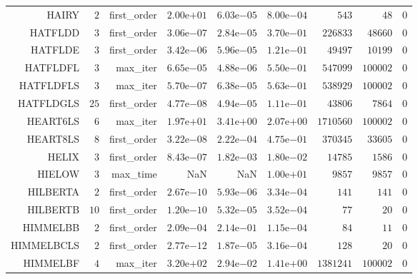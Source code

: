 \begin{longtable}{rrrrrrrrr}
HAIRY & \(     2\) & first\_order & \( 2.00\)e\(+01\) & \( 6.03\)e\(-05\) & \( 8.00\)e\(-04\) & \(   543\) & \(    48\) & \(     0\) \\
HATFLDD & \(     3\) & first\_order & \( 3.06\)e\(-07\) & \( 2.84\)e\(-05\) & \( 3.70\)e\(-01\) & \(226833\) & \( 48660\) & \(     0\) \\
HATFLDE & \(     3\) & first\_order & \( 3.42\)e\(-06\) & \( 5.96\)e\(-05\) & \( 1.21\)e\(-01\) & \( 49497\) & \( 10199\) & \(     0\) \\
HATFLDFL & \(     3\) & max\_iter & \( 6.65\)e\(-05\) & \( 4.88\)e\(-06\) & \( 5.50\)e\(-01\) & \(547099\) & \(100002\) & \(     0\) \\
HATFLDFLS & \(     3\) & max\_iter & \( 5.70\)e\(-07\) & \( 6.38\)e\(-05\) & \( 5.63\)e\(-01\) & \(538929\) & \(100002\) & \(     0\) \\
HATFLDGLS & \(    25\) & first\_order & \( 4.77\)e\(-08\) & \( 4.94\)e\(-05\) & \( 1.11\)e\(-01\) & \( 43806\) & \(  7864\) & \(     0\) \\
HEART6LS & \(     6\) & max\_iter & \( 1.97\)e\(+01\) & \( 3.41\)e\(+00\) & \( 2.07\)e\(+00\) & \(1710560\) & \(100002\) & \(     0\) \\
HEART8LS & \(     8\) & first\_order & \( 3.22\)e\(-08\) & \( 2.22\)e\(-04\) & \( 4.75\)e\(-01\) & \(370345\) & \( 33605\) & \(     0\) \\
HELIX & \(     3\) & first\_order & \( 8.43\)e\(-07\) & \( 1.82\)e\(-03\) & \( 1.80\)e\(-02\) & \( 14785\) & \(  1586\) & \(     0\) \\
HIELOW & \(     3\) & max\_time &       NaN &       NaN & \( 1.00\)e\(+01\) & \(  9857\) & \(  9857\) & \(     0\) \\
HILBERTA & \(     2\) & first\_order & \( 2.67\)e\(-10\) & \( 5.93\)e\(-06\) & \( 3.34\)e\(-04\) & \(   141\) & \(   141\) & \(     0\) \\
HILBERTB & \(    10\) & first\_order & \( 1.20\)e\(-10\) & \( 5.32\)e\(-05\) & \( 3.52\)e\(-04\) & \(    77\) & \(    20\) & \(     0\) \\
HIMMELBB & \(     2\) & first\_order & \( 2.09\)e\(-04\) & \( 2.14\)e\(-01\) & \( 1.15\)e\(-04\) & \(    84\) & \(    11\) & \(     0\) \\
HIMMELBCLS & \(     2\) & first\_order & \( 2.77\)e\(-12\) & \( 1.87\)e\(-05\) & \( 3.16\)e\(-04\) & \(   128\) & \(    20\) & \(     0\) \\
HIMMELBF & \(     4\) & max\_iter & \( 3.20\)e\(+02\) & \( 2.94\)e\(-02\) & \( 1.41\)e\(+00\) & \(1381241\) & \(100002\) & \(     0\) \\

\end{longtable}
